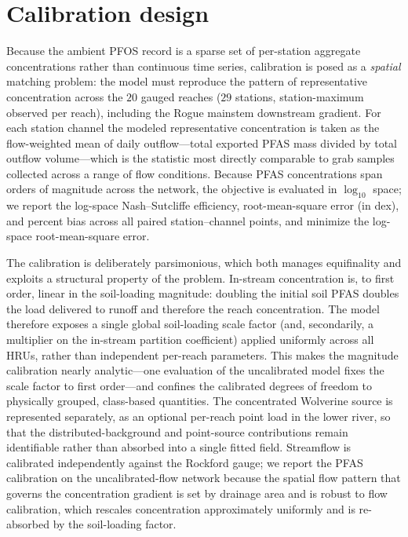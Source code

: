 \section{Calibration design}\label{sec:calib}
Because the ambient PFOS record is a sparse set of per-station aggregate concentrations rather than continuous time series, calibration is posed as a \emph{spatial} matching problem: the model must reproduce the pattern of representative concentration across the $20$ gauged reaches ($29$ stations, station-maximum observed per reach), including the Rogue mainstem downstream gradient. For each station channel the modeled representative concentration is taken as the flow-weighted mean of daily outflow---total exported PFAS mass divided by total outflow volume---which is the statistic most directly comparable to grab samples collected across a range of flow conditions. Because PFAS concentrations span orders of magnitude across the network, the objective is evaluated in $\log_{10}$ space; we report the log-space Nash--Sutcliffe efficiency, root-mean-square error (in dex), and percent bias across all paired station--channel points, and minimize the log-space root-mean-square error.

The calibration is deliberately parsimonious, which both manages equifinality and exploits a structural property of the problem. In-stream concentration is, to first order, linear in the soil-loading magnitude: doubling the initial soil PFAS doubles the load delivered to runoff and therefore the reach concentration. The model therefore exposes a single global soil-loading scale factor (and, secondarily, a multiplier on the in-stream partition coefficient) applied uniformly across all HRUs, rather than independent per-reach parameters. This makes the magnitude calibration nearly analytic---one evaluation of the uncalibrated model fixes the scale factor to first order---and confines the calibrated degrees of freedom to physically grouped, class-based quantities. The concentrated Wolverine source is represented separately, as an optional per-reach point load in the lower river, so that the distributed-background and point-source contributions remain identifiable rather than absorbed into a single fitted field. Streamflow is calibrated independently against the Rockford gauge; we report the PFAS calibration on the uncalibrated-flow network because the spatial flow pattern that governs the concentration gradient is set by drainage area and is robust to flow calibration, which rescales concentration approximately uniformly and is re-absorbed by the soil-loading factor.


